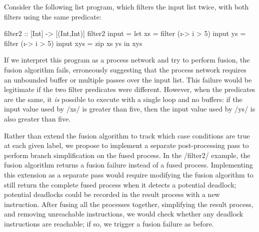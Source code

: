 Consider the following list program, which filters the input list twice, with both filters using the same predicate:

\begin{haskell}
filter2 :: [Int] -> [(Int,Int)]
filter2 input =
 let xs  = filter (\i -> i > 5) input
     ys  = filter (\i -> i > 5) input
     xys = zip xs ys
 in  xys
\end{haskell}

If we interpret this program as a process network and try to perform fusion, the fusion algorithm fails, erroneously suggesting that the process network requires an unbounded buffer or multiple passes over the input list.
This failure would be legitimate if the two filter predicates were different.
However, when the predicates are the same, it \emph{is} possible to execute with a single loop and no buffers: if the input value used by \Hs/xs/ is greater than five, then the input value used by \Hs/ys/ is also greater than five.

Rather than extend the fusion algorithm to track which case conditions are true at each given label, we propose to implement a separate post-processing pass to perform branch simplification on the fused process.
In the \Hs/filter2/ example, the fusion algorithm returns a fusion failure instead of a fused process.
Implementing this extension as a separate pass would require modifying the fusion algorithm to still return the complete fused process when it detects a potential deadlock; potential deadlocks could be recorded in the result process with a new instruction.
After fusing all the processes together, simplifying the result process, and removing unreachable instructions, we would check whether any deadlock instructions are reachable; if so, we trigger a fusion failure as before.

